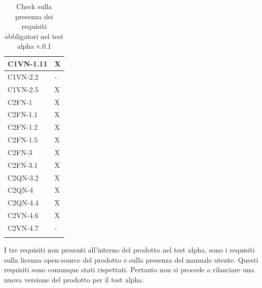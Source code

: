 \begin{footnotesize}
\begin{longtable}{|p{}|p{}|}
 C1VN-1.11&X  \\ \hline
 C1VN-2.2&- \\ \hline
 C1VN-2.5&X  \\ \hline
 C2FN-1&X    \\ \hline
 C2FN-1.1&X    \\ \hline
 C2FN-1.2&X   \\ \hline
 C2FN-1.5&X   \\ \hline
 C2FN-3&X   \\ \hline
 C2FN-3.1&X   \\ \hline
 C2QN-3.2&X   \\ \hline
 C2QN-4 &X  \\ \hline
 C2QN-4.4&X  \\ \hline
 C2VN-4.6&X    \\ \hline
 C2VN-4.7&-  \\ \hline
\caption{Check sulla presenza dei requisiti obbligatori nel test alpha v.0.1}
\end{longtable}
\end{footnotesize}
I tre requisiti non presenti all'interno del prodotto nel test alpha, sono i
requisiti sulla licenza open-source del prodotto e sulla presenza del manuale utente.
Questi requisiti sono comunque stati rispettati. Pertanto non si procede a
rilasciare una nuova versione del prodotto per il test alpha.

